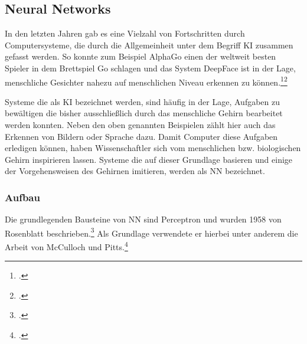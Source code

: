 
\subsection{Neural Networks} \label{sec:NN}
In den letzten Jahren gab es eine Vielzahl von Fortschritten durch Computersysteme, die durch die Allgemeinheit unter dem Begriff \ac{KI} zusammen gefasst werden. So konnte zum Beispiel AlphaGo einen der weltweit besten Spieler in dem Brettspiel Go schlagen und das System DeepFace ist in der Lage, menschliche Gesichter nahezu auf menschlichen Niveau erkennen zu können.\footcites[Vgl.][]{spiegelGoogleComputerAlphaGo2016}\footcite[Vgl.][]{taigman2014deepface}

Systeme die als \ac{KI} bezeichnet werden, sind häufig in der Lage, Aufgaben zu bewältigen die bisher ausschließlich durch das menschliche Gehirn bearbeitet werden konnten. Neben den oben genannten Beispielen zählt hier auch das Erkennen von Bildern oder Sprache dazu. Damit Computer diese Aufgaben erledigen können, haben Wissenschaftler sich vom menschlichen bzw. biologischen Gehirn inspirieren lassen. Systeme die auf dieser Grundlage basieren und einige der Vorgehensweisen des Gehirnen imitieren, werden als \ac{NN} bezeichnet.

\subsubsection{Aufbau}
Die grundlegenden Bausteine von \ac{NN} sind Perceptron und wurden 1958 von Rosenblatt beschrieben.\footcite[Vgl.][]{rosenblattPerceptronProbabilisticModel1958} Als Grundlage verwendete er hierbei unter anderem die Arbeit von McCulloch und Pitts.\footcite[Vgl.][]{mccullochLogicalCalculusIdeas1943}


